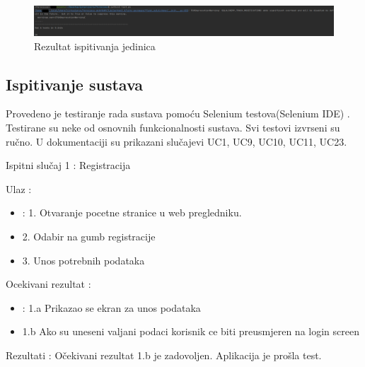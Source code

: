 			\begin{figure}[H]
				\includegraphics[width=1\linewidth]{slike/unit_test_result.PNG} %
				\caption{Rezultat ispitivanja jedinica}
				\label{fig:unit2} %
			\end{figure}
			
			
			\subsection{Ispitivanje sustava}
			
			 \noindent Provedeno je testiranje rada sustava pomoću Selenium testova(Selenium IDE)
			 . Testirane su neke od osnovnih funkcionalnosti sustava. Svi testovi izvrseni su ručno. U dokumentaciji su prikazani slučajevi UC1, UC9, UC10, UC11, UC23.

			\noindent Ispitni slučaj 1 : Registracija

			\noindent Ulaz : 
	
			\begin{itemize}
				\item : 1. Otvaranje pocetne stranice u web pregledniku.
				\item   2. Odabir na gumb registracije
				\item   3. Unos potrebnih podataka
			\end{itemize}

			\noindent Ocekivani rezultat : 

			\begin{itemize}
				\item : 1.a Prikazao se ekran za unos podataka
				\item   1.b Ako su uneseni valjani podaci korisnik ce biti preusmjeren na login screen
			\end{itemize}
	
			\noindent Rezultati : Očekivani rezultat 1.b je zadovoljen. Aplikacija je prošla test. 


